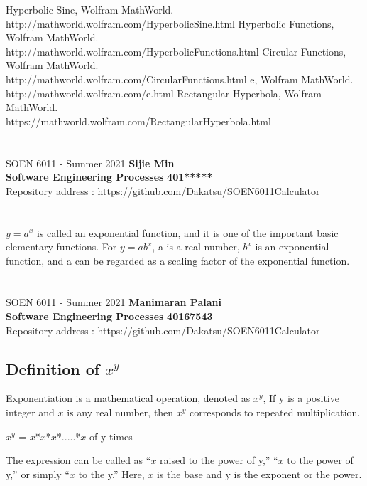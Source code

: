 \documentclass[letterpaper, 11pt]{report}
\begin{document}
\begin{thebibliography}{}
Hyperbolic Sine, Wolfram MathWorld.
\\http://mathworld.wolfram.com/HyperbolicSine.html
Hyperbolic Functions, Wolfram MathWorld.
\\http://mathworld.wolfram.com/HyperbolicFunctions.html
Circular Functions, Wolfram MathWorld.
\\http://mathworld.wolfram.com/CircularFunctions.html
e, Wolfram MathWorld.
\\http://mathworld.wolfram.com/e.html
Rectangular Hyperbola, Wolfram MathWorld.
\\https://mathworld.wolfram.com/RectangularHyperbola.html
\end{thebibliography}
\pagebreak

\section*{}
\normalsize {SOEN 6011 - Summer 2021} \hfill \textbf{Sijie Min} \\
\textbf{ Software Engineering Processes}  \hfill \textbf{401*****} \\
\hfill Repository address : https://github.com/Dakatsu/SOEN6011Calculator
\\\\\\
$y=a^x$ is called an exponential function, and it is one of the important basic elementary functions. For $y=ab^x$, a is a real number, $b^x$ is an exponential function, and a can be regarded as a scaling factor of the exponential function.
 \begin{center} 
\end{center}
\pagebreak

\newcommand{\R}{\mathbb{R}}
\renewcommand{\labelitemi}{$\star$}
\section*{}
\normalsize {SOEN 6011 - Summer 2021} \hfill \textbf{Manimaran Palani} \\
\textbf{ Software Engineering Processes}  \hfill \textbf{40167543} \\
\hfill Repository address : https://github.com/Dakatsu/SOEN6011Calculator
\subsection*{Definition of \(x^y\)}
\cite{mathInsight} Exponentiation is a mathematical operation, denoted as \(x^y\), If y is a positive integer and \(x\) is any real number, then \(x^y\) corresponds to repeated multiplication.
 \begin{center} \(x^y\) = \(x\)*\(x\)*\(x\)*.....*\(x\) of y times \end{center}
The expression can be called as “\(x\) raised to the power of y,” “\(x\) to the power of y,” or simply “\(x\) to the y.” Here, \(x\) is the base and y is the exponent or the power.
\end{document}
